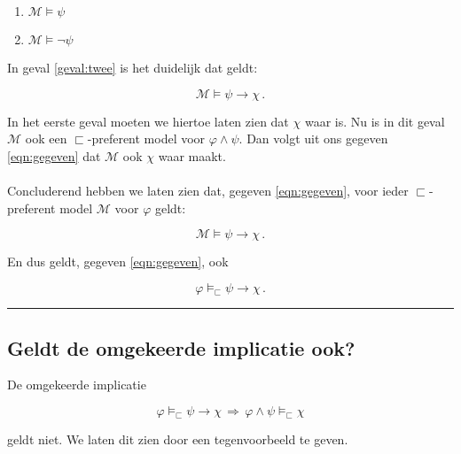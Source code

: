 \documentclass[a4paper,11pt]{article}
\begin{document}
\begin{enumerate}
\item\label{geval:een} $\mathcal{M} \vDash \psi$
\item\label{geval:twee} $\mathcal{M} \vDash \neg \psi$
\end{enumerate}

In geval \ref{geval:twee} is het duidelijk dat geldt:

\begin{displaymath}
\mathcal{M} \vDash \psi \rightarrow \chi \, \mbox{.}
\end{displaymath}

In het eerste geval moeten we hiertoe laten zien dat $\chi$ waar is. Nu is in
dit geval $\mathcal{M}$ ook een $\sqsubset$-preferent model voor $\varphi
\wedge \psi$. Dan volgt uit ons gegeven \ref{eqn:gegeven} dat $\mathcal{M}$
ook $\chi$ waar maakt.

\paragraph{}

Concluderend hebben we laten zien dat, gegeven \ref{eqn:gegeven}, voor ieder
$\sqsubset$-preferent model $\mathcal{M}$ voor $\varphi$ geldt:

\begin{displaymath}
\mathcal{M} \vDash \psi \rightarrow \chi \, \mbox{.}
\end{displaymath}

En dus geldt, gegeven \ref{eqn:gegeven}, ook

\begin{displaymath}
\varphi \vDash_{\sqsubset} \psi \rightarrow \chi \, \mbox{.}
\end{displaymath}

\hfill\rule{2.1mm}{2.mm}


\subsection*{Geldt de omgekeerde implicatie ook?}

De omgekeerde implicatie

\begin{displaymath}
\varphi \vDash_{\sqsubset} \psi \rightarrow \chi
\, \Longrightarrow \,
\varphi \wedge \psi \vDash_{\sqsubset} \chi
\end{displaymath}

geldt niet. We laten dit zien door een tegenvoorbeeld te geven.
\end{document}

